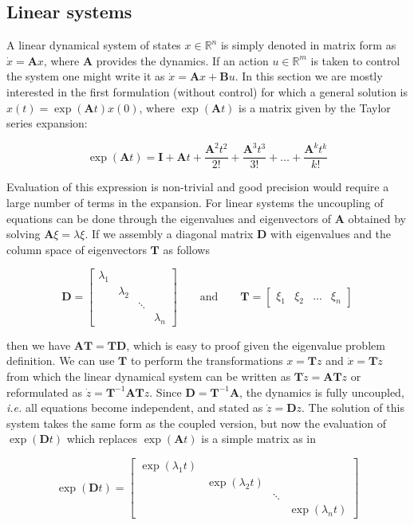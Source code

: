 \subsection{Linear systems}

A linear dynamical system of states $x\in\mathbb{R}^{n}$ is simply denoted in matrix form as $\dot{x}=\mathbf{A}x$, where $\mathbf{A}$ provides the dynamics. If an action $u\in\mathbb{R}^{m}$ is taken to control the system one might write it as $\dot{x}=\mathbf{A}x+\mathbf{B}u$. In this section we are mostly interested in the first formulation (without control) for which a general solution is $x(t)=\exp(\mathbf{A}t)x(0)$, where $\exp(\mathbf{A}t)$ is a matrix given by the Taylor series expansion:

\begin{equation}
\exp(\mathbf{A}t)=\mathbf{I}+\mathbf{A}t+\frac{\mathbf{A}^2t^2}{2!}+\frac{\mathbf{A}^3t^3}{3!}+\dots+\frac{\mathbf{A}^kt^k}{k!}
\end{equation}

Evaluation of this expression is non-trivial and good precision would require a large number of terms in the expansion. For linear systems the uncoupling of equations can be done through the eigenvalues and eigenvectors of $\mathbf{A}$ obtained by solving $\mathbf{A}\xi=\lambda\xi$. If we assembly a diagonal matrix $\mathbf{D}$ with eigenvalues and the column space of eigenvectors $\mathbf{T}$ as follows

\begin{equation}
\mathbf{D}=
\begin{bmatrix}
\lambda_{1} & & & \\
& \lambda_{2} & & \\ 
& & \ddots & \\
& & & \lambda_{n}
\end{bmatrix}
\qquad\text{and}\qquad
\mathbf{T}=
\begin{bmatrix}
\xi_{1} & \xi_{2} & \dots & \xi_{n}
\end{bmatrix}
\end{equation}

\noindent{}then we have $\mathbf{A}\mathbf{T}=\mathbf{T}\mathbf{D}$, which is easy to proof given the eigenvalue problem definition. We can use $\mathbf{T}$ to perform the transformations $x=\mathbf{T}z$ and $\dot{x}=\mathbf{T}\dot{z}$ from which the linear dynamical system can be written as $\mathbf{T}\dot{z}=\mathbf{A}\mathbf{T}z$ or reformulated as $\dot{z}=\mathbf{T}^{-1}\mathbf{A}\mathbf{T}z$. Since $\mathbf{D}=\mathbf{T}^{-1}\mathbf{A}$, the dynamics is fully uncoupled, \emph{i.e.} all equations become independent, and stated as $\dot{z}=\mathbf{D}z$. The solution of this system takes the same form as the coupled version, but now the evaluation of $\exp(\mathbf{D}t)$ which replaces $\exp(\mathbf{A}t)$ is a simple matrix as in

\begin{equation}
\exp(\mathbf{D}t)=
\begin{bmatrix}
	\exp(\lambda_{1}t) & & & \\
	& \exp(\lambda_{2}t) & & \\ 
	& & \ddots & \\
	& & & \exp(\lambda_{n}t)
\end{bmatrix}
\end{equation}

\endinput